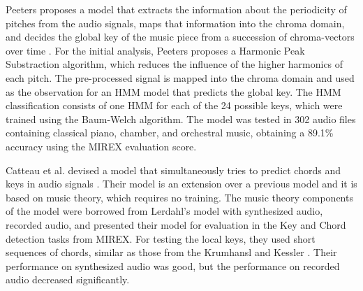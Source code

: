 
Peeters proposes a model that extracts the information about
the periodicity of pitches from the audio signals, maps that
information into the chroma domain, and decides the global
key of the music piece from a succession of chroma-vectors
over time \parencite{peeters2006chromabased}. For the
initial analysis, Peeters proposes a Harmonic Peak
Substraction algorithm, which reduces the influence of the
higher harmonics of each pitch. The pre-processed signal is
mapped into the chroma domain and used as the observation
for an HMM model that predicts the global key. The HMM
classification consists of one HMM for each of the 24
possible keys, which were trained using the Baum-Welch
algorithm. The model was tested in 302 audio files
containing classical piano, chamber, and orchestral music,
obtaining a 89.1\% accuracy using the MIREX evaluation
score.



Catteau et al. devised a model that simultaneously tries to
predict chords and keys in audio signals
\parencite{catteau2007probabilistic}. Their model is an
extension over a previous model \parencite{bello2005robust}
and it is based on music theory, which requires no training.
The music theory components of the model were borrowed from
Lerdahl's
model with synthesized audio, recorded audio, and presented
their model for evaluation in the Key and Chord detection
tasks from MIREX. For testing the local keys, they used
short sequences of chords, similar as those from the
Krumhansl and Kessler \parencite{krumhansl1982tracing}.
Their performance on synthesized audio was good, but the
performance on recorded audio decreased significantly.

